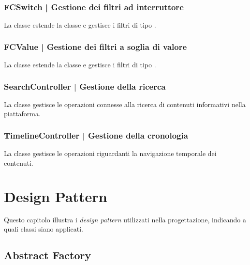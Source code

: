 \documentclass[10pt,a4paper,headinclude,footinclude,hidelinks]{scrreprt} %
\begin{document}
	\subsection[FCSwitch]{FCSwitch | Gestione dei filtri ad interruttore}
	\label{sec:stage:design:controller:filter-switch}
	La classe \textit{} estende la classe \textit{} e gestisce i filtri di tipo \textit{}.

	\subsection[FCValue]{FCValue | Gestione dei filtri a soglia di valore}
	\label{sec:stage:design:controller:filter-value}
	La classe \textit{} estende la classe \textit{} e gestisce i filtri di tipo \textit{}.

	\subsection[SearchController]{SearchController | Gestione della ricerca}
	\label{sec:stage:design:controller:search}
	La classe \textit{} gestisce le operazioni connesse alla ricerca di contenuti informativi nella piattaforma.	

	\subsection[TimelineController]{TimelineController | Gestione della cronologia}
	\label{sec:stage:design:controller:timeline}
	La classe \textit{} gestisce le operazioni riguardanti la navigazione temporale dei contenuti.

	\chapter{Design Pattern}
	\label{ch:stage:design:pattern}
	Questo capitolo illustra i \textit{design pattern} utilizzati nella progettazione, indicando a quali classi siano applicati.

	\section{Abstract Factory}
	\label{sec:stage:design:pattern:factory}
\end{document}
